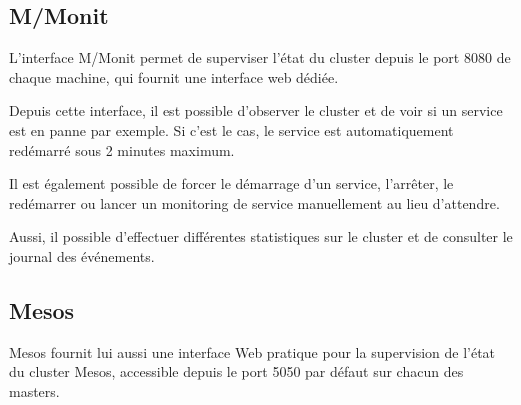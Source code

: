 \documentclass[a4paper, 11pt, titlepage]{article}
\begin{document}
\subsection{M/Monit}

L'interface M/Monit permet de superviser l'état du cluster depuis le port 8080 de chaque machine, qui fournit une interface web dédiée.

Depuis cette interface, il est possible d'observer le cluster et de voir si un service est en panne par exemple.
Si c'est le cas, le service est automatiquement redémarré sous 2 minutes maximum.

Il est également possible de forcer le démarrage d'un service, l'arrêter, le redémarrer ou lancer un monitoring de service manuellement au lieu d'attendre.

Aussi, il possible d'effectuer différentes statistiques sur le cluster et de consulter le journal des événements.


\subsection{Mesos}

Mesos fournit lui aussi une interface Web pratique pour la supervision de l'état du cluster Mesos, accessible depuis le port 5050 par défaut sur chacun des masters.
\end{document}
